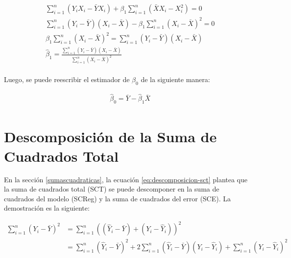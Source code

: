 \documentclass[
  11pt,
]{book}
\theoremstyle{definition}
\theoremstyle{definition}
\theoremstyle{definition}
\theoremstyle{definition}
\theoremstyle{remark}
\begin{document}
\begin{equation}
\begin{split}
&\sum_{i=1}^n (Y_iX_i - \bar{Y}X_i) + \beta_1\sum_{i=1}^n(\bar{X}X_i - X_i^2) = 0 \\
&\sum_{i=1}^n (Y_i - \bar{Y})(X_i - \bar{X}) - \beta_1\sum_{i=1}^n(X_i -\bar{X})^2 = 0 \\
&\beta_1\sum_{i=1}^n(X_i -\bar{X})^2 = \sum_{i=1}^n (Y_i - \bar{Y})(X_i - \bar{X}) \\
&\widehat{\beta}_1 = \frac{\displaystyle\sum_{i=1}^n (Y_i - \bar{Y})(X_i - \bar{X})}{\displaystyle\sum_{i=1}^n(X_i -\bar{X})^2} \\
\end{split}
\label{eq:beta1estimador-demostracion6}
\end{equation}

Luego, se puede reescribir el estimador de \(\beta_0\) de la siguiente manera:

\begin{equation}
\begin{split}
&\widehat{\beta}_0 = \bar{Y} - \widehat{\beta}_1\bar{X} \\
\end{split}
\label{eq:beta0estimador-demostracion3}
\end{equation}

\section{Descomposición de la Suma de Cuadrados Total}\label{descomposiciuxf3n-de-la-suma-de-cuadrados-total}

En la sección \ref{sumascuadraticas}, la ecuación \eqref{eq:descomposicion-sct} plantea que la suma de cuadrados total (SCT) se puede descomponer en la suma de cuadrados del modelo (SCReg) y la suma de cuadrados del error (SCE). La demostración es la siguiente:

\begin{equation}
\begin{split}
\sum_{i=1}^n\left( Y_i - \bar{Y} \right)^2 &= \sum_{i=1}^n\left( \left( \widehat{Y}_i - \bar{Y} \right) + \left( Y_i - \widehat{Y}_i \right) \right)^2\\
&= \sum_{i=1}^n\left( \widehat{Y}_i - \bar{Y} \right)^2  + 2\sum_{i=1}^n\left( \widehat{Y}_i - \bar{Y} \right)\left( Y_i - \widehat{Y}_i \right) + \sum_{i=1}^n\left( Y_i - \widehat{Y}_i \right)^2\\
\end{split}
\label{eq:demostracionSCT1}
\end{equation}
\end{document}
